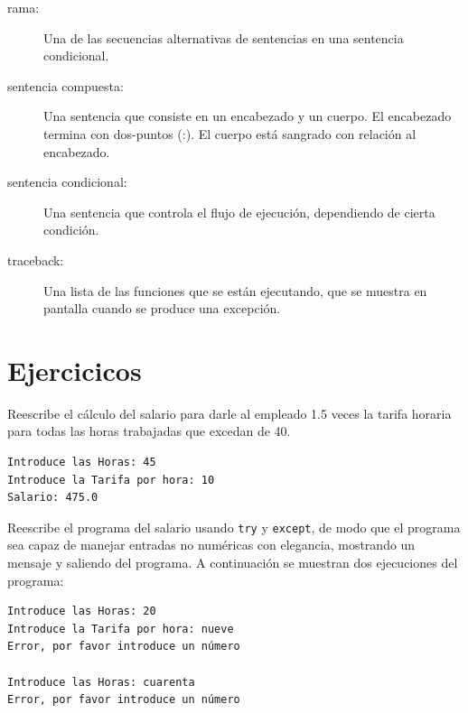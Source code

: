 \begin{description}
\item[rama:] Una de las secuencias alternativas de sentencias en una
sentencia condicional.

\item[sentencia compuesta:]  Una sentencia que consiste en un encabezado
y un cuerpo. El encabezado termina con dos-puntos (:). El cuerpo está sangrado
con relación al encabezado.

\item[sentencia condicional:]  Una sentencia que controla el flujo de
ejecución, dependiendo de cierta condición.

\item[traceback:]  Una lista de las funciones que se están ejecutando,
que se muestra en pantalla cuando se produce una excepción.

\end{description}

\section{Ejercicicos}

\begin{ex}
Reescribe el cálculo del salario para darle al empleado 1.5
veces la tarifa horaria para todas
las horas trabajadas que excedan de 40.

\begin{verbatim}
Introduce las Horas: 45
Introduce la Tarifa por hora: 10
Salario: 475.0
\end{verbatim}
\end{ex}

\begin{ex}
Reescribe el programa del salario usando {\tt try} y {\tt except},
de modo que el programa sea capaz de manejar entradas no numéricas con elegancia,
mostrando un mensaje y saliendo del programa.
A continuación se muestran dos ejecuciones del programa:

\begin{verbatim}
Introduce las Horas: 20
Introduce la Tarifa por hora: nueve
Error, por favor introduce un número

Introduce las Horas: cuarenta
Error, por favor introduce un número
\end{verbatim}
\end{ex}

